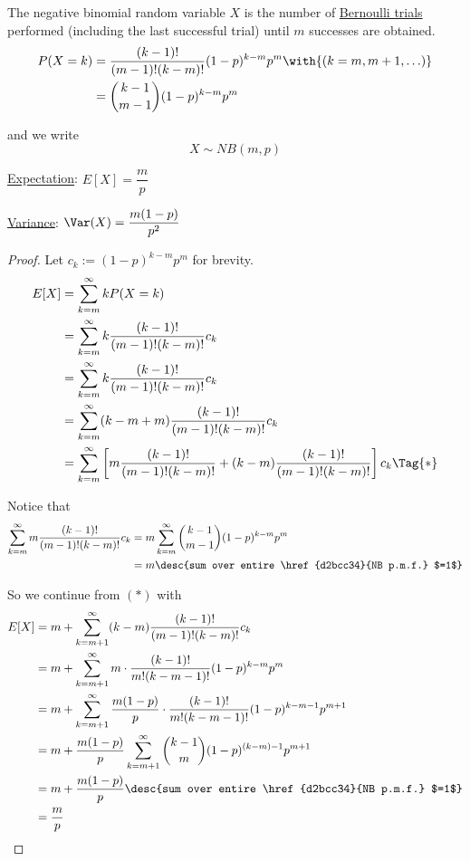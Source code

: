 \label{d2bcc34}

The negative binomial random variable $X$ is the number of
\href{e2d50c6}{Bernoulli trials} performed (including the last successful
trial) until $m$ successes are obtained.
\begin{align*}
  P(X=k) &=\frac{(k-1)!}{(m-1)!(k-m)!}(1-p)^{k-m}p^m\with{(k=m,m+1,\ldots)} \\
         &=\binom{k-1}{m-1}(1-p)^{k-m}p^m
\end{align*}

and we write
$$
  X\sim NB(m,p)
$$

\label{e814685}

\begin{enumerati}
  \item\href{ecb2162}{Expectation}: $E[X]=\dfrac mp$
  \item\href{ddd95d5}{Variance}: $\Var(X)=\dfrac{m(1-p)}{p^2}$
\end{enumerati}

\begin{proof}
  \def\S#1{\sum_{k=#1}^\infty}\def\f{\frac}

  Let $c_k:=(1-p)^{k-m}p^m$ for brevity.
  \begin{align*}
    E[X]
     &=\S mkP(X=k)                                                                        \\
     &=\S mk\f{(k-1)!}{(m-1)!(k-m)!}c_k                                                   \\
     &=\S mk\f{(k-1)!}{(m-1)!(k-m)!}c_k                                                   \\
     &=\S m(k-m+m)\f{(k-1)!}{(m-1)!(k-m)!}c_k                                             \\
     &=\S m\left[m\f{(k-1)!}{(m-1)!(k-m)!}+(k-m)\f{(k-1)!}{(m-1)!(k-m)!}\right]c_k\Tag{*}
  \end{align*}

  Notice that
  \begin{align*}
    \S{m}m\f{(k-1)!}{(m-1)!(k-m)!}c_k
     &= m\S{m}\binom{k-1}{m-1}(1-p)^{k-m}p^m                  \\
     &=m\desc{sum over entire \href{d2bcc34}{NB p.m.f.} $=1$}
  \end{align*}

  So we continue from $(*)$ with
  \begin{align*}
    E[X] &=m+\S{m+1}(k-m)\f{(k-1)!}{(m-1)!(k-m)!}c_k                             \\
         &=m+\S{m+1}m\cdot\f{(k-1)!}{m!(k-m-1)!}(1-p)^{k-m}p^m                   \\
         &=m+\S{m+1}\f{m(1-p)}{p}\cdot\f{(k-1)!}{m!(k-m-1)!}(1-p)^{k-m-1}p^{m+1} \\
         &=m+\f{m(1-p)}{p}\S{m+1}\binom{k-1}{m}(1-p)^{(k-m)-1}p^{m+1}            \\
         &=m+\f{m(1-p)}{p}\desc{sum over entire \href{d2bcc34}{NB p.m.f.} $=1$}  \\
         &=\f{m}{p}
  \end{align*}
\end{proof}

